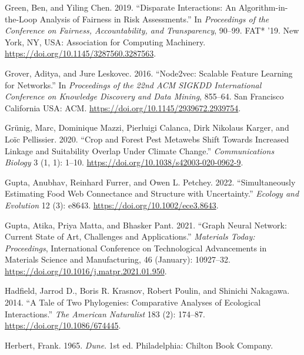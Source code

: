 \documentclass[
  letterpaper,
  DIV=11,
  numbers=noendperiod]{scrartcl}
\newlength{\cslhangindent}
\newlength{\cslentryspacingunit} %
\newenvironment{CSLReferences}[2] %
 {%
  \setlength{\parindent}{0pt}
  \ifodd #1
  \let\oldpar\par
  \def\par{\hangindent=\cslhangindent\oldpar}
  \fi
  \setlength{\parskip}{#2\cslentryspacingunit}
 }%
 {}
\begin{document}
\begin{CSLReferences}{1}{0}
\leavevmode{}%
Green, Ben, and Yiling Chen. 2019. {``Disparate {Interactions}: {An
Algorithm-in-the-Loop Analysis} of {Fairness} in {Risk Assessments}.''}
In \emph{Proceedings of the {Conference} on {Fairness},
{Accountability}, and {Transparency}}, 90--99. {FAT}* '19. {New York,
NY, USA}: {Association for Computing Machinery}.
\url{https://doi.org/10.1145/3287560.3287563}.

\leavevmode{}%
Grover, Aditya, and Jure Leskovec. 2016. {``Node2vec: {Scalable Feature
Learning} for {Networks}.''} In \emph{Proceedings of the 22nd {ACM
SIGKDD International Conference} on {Knowledge Discovery} and {Data
Mining}}, 855--64. {San Francisco California USA}: {ACM}.
\url{https://doi.org/10.1145/2939672.2939754}.

\leavevmode{}%
Grünig, Marc, Dominique Mazzi, Pierluigi Calanca, Dirk Nikolaus Karger,
and Loïc Pellissier. 2020. {``Crop and Forest Pest Metawebs Shift
Towards Increased Linkage and Suitability Overlap Under Climate
Change.''} \emph{Communications Biology} 3 (1, 1): 1--10.
\url{https://doi.org/10.1038/s42003-020-0962-9}.

\leavevmode{}%
Gupta, Anubhav, Reinhard Furrer, and Owen L. Petchey. 2022.
{``Simultaneously Estimating Food Web Connectance and Structure with
Uncertainty.''} \emph{Ecology and Evolution} 12 (3): e8643.
\url{https://doi.org/10.1002/ece3.8643}.

\leavevmode{}%
Gupta, Atika, Priya Matta, and Bhasker Pant. 2021. {``Graph Neural
Network: {Current} State of {Art}, Challenges and Applications.''}
\emph{Materials Today: Proceedings}, International {Conference} on
{Technological Advancements} in {Materials Science} and {Manufacturing},
46 (January): 10927--32.
\url{https://doi.org/10.1016/j.matpr.2021.01.950}.

\leavevmode{}%
Hadfield, Jarrod D., Boris R. Krasnov, Robert Poulin, and Shinichi
Nakagawa. 2014. {``A {Tale} of {Two Phylogenies}: {Comparative Analyses}
of {Ecological Interactions}.''} \emph{The American Naturalist} 183 (2):
174--87. \url{https://doi.org/10.1086/674445}.

\leavevmode{}%
Herbert, Frank. 1965. \emph{Dune}. 1st ed. {Philadelphia}: {Chilton Book
Company}.


\end{CSLReferences}
\end{document}
